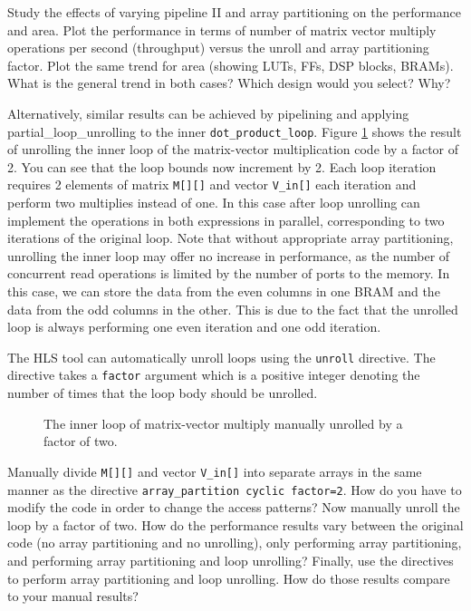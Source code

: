 \begin{exercise}
Study the effects of varying pipeline II and array partitioning on the performance and area. Plot the performance in terms of number of matrix vector multiply operations per second (throughput) versus the unroll and array partitioning factor. Plot the same trend for area (showing LUTs, FFs, DSP blocks, BRAMs). What is the general trend in both cases? Which design would you select? Why?
\end{exercise} 

Alternatively, similar results can be achieved by pipelining and applying \gls{partial_loop_unrolling} to the inner \lstinline|dot_product_loop|.   Figure \ref{fig:matrix_vector_unroll_inner2} shows the result of unrolling the inner loop of the matrix-vector multiplication code by a factor of 2. You can see that the loop bounds now increment by 2. Each loop iteration requires 2 elements of matrix \lstinline|M[][]| and vector \lstinline|V_in[]| each iteration and perform two multiplies instead of one. In this case after loop unrolling \VHLS can implement the operations in both expressions in parallel, corresponding to two iterations of the original loop. Note that without appropriate array partitioning, unrolling the inner loop may offer no increase in performance, as the number of concurrent read operations is limited by the number of ports to the memory.  In this case, we can store the data from the even columns in one BRAM and the data from the odd columns in the other. This is due to the fact that the unrolled loop is always performing one even iteration and one odd iteration. 

\begin{aside}
The HLS tool can automatically unroll loops using the \texttt{unroll} directive. The directive takes a \texttt{factor} argument which is a positive integer denoting the number of times that the loop body should be unrolled. 
\end{aside}

\begin{figure}
\begin{footnotesize}

\end{footnotesize}
\caption{The inner loop of matrix-vector multiply manually unrolled by a factor of two. }
\label{fig:matrix_vector_unroll_inner2}
\end{figure}

\begin{exercise}
Manually divide \lstinline|M[][]| and vector \lstinline|V_in[]| into separate arrays in the same manner as the directive \lstinline|array_partition cyclic factor=2|. How do you have to modify the code in order to change the access patterns? Now manually unroll the loop by a factor of two. How do the performance results vary between the original code (no array partitioning and no unrolling), only performing array partitioning, and performing array partitioning and loop unrolling? Finally, use the directives to perform array partitioning and loop unrolling. How do those results compare to your manual results?
\end{exercise} 

